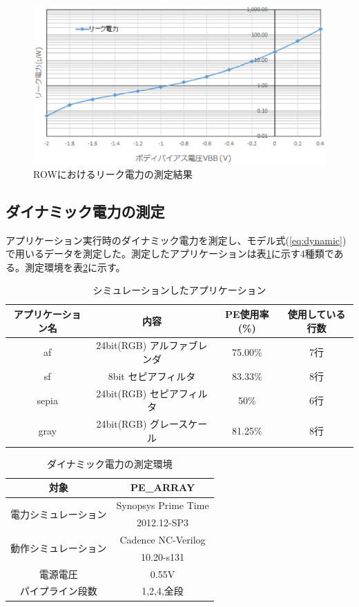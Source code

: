 {\begin{figure}[h]
\centering
\includegraphics[width=12cm]{./chap6/fig/leak_vs_vbb.eps}
\caption{ROWにおけるリーク電力の測定結果}
\label{fig:leak_vs_vbb}
\end{figure}

\subsection{ダイナミック電力の測定}
\label{dynamic_measure}

アプリケーション実行時のダイナミック電力を測定し、モデル式(\ref{eq:dynamic})で用いるデータを測定した。測定したアプリケーションは表\ref{table:app}に示す4種類である。測定環境を表\ref{table:calc_dynamic}に示す。
\begin{table}[h]
\centering
\caption{シミュレーションしたアプリケーション}
\label{table:app}
\begin{tabular}{|c|c|c|c|} \hline
アプリケーション名 & 内容 & PE使用率(\%) & 使用している行数\\ \hline \hline
af & 24bit(RGB) アルファブレンダ & 75.00\% & 7行\\ \hline
sf & 8bit セピアフィルタ & 83.33\% & 8行 \\ \hline
sepia & 24bit(RGB) セピアフィルタ & 50\%  & 6行\\ \hline
gray & 24bit(RGB) グレースケール & 81.25\% & 8行\\ \hline
\end{tabular}
\end{table}

\begin{table}[h]
\centering
\caption{ダイナミック電力の測定環境}
\label{table:calc_dynamic}
\begin{tabular}{|c|c|} \hline
対象 & PE\_ARRAY \\ \hline
\multirow{2}{*}{電力シミュレーション} & Synopsys Prime Time \\
& 2012.12-SP3 \\ \hline
\multirow{2}{*}{動作シミュレーション}& Cadence NC-Verilog \\
& 10.20-s131 \\ \hline
電源電圧 & 0.55V \\ \hline
パイプライン段数 & 1,2,4,全段 \\ \hline
\end{tabular}
\end{table}

}
